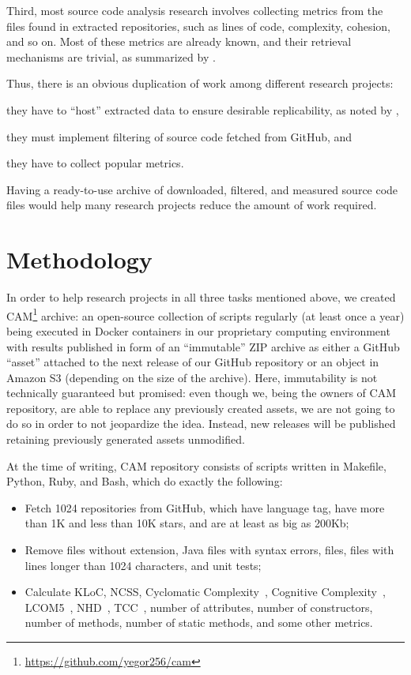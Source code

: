 \documentclass[11pt,sigplan,nonacm]{acmart}
\newcommand\cam{{\sffamily CAM}}
\begin{document}
Third, most source code analysis research involves collecting metrics from the files found in extracted repositories, such as lines of code, complexity, cohesion, and so on. Most of these metrics are already known, and their retrieval mechanisms are trivial, as summarized by \citet{nunez2017source}.

Thus, there is an obvious duplication of work among different research projects:
\begin{inparaenum}[(a)]
\item they have to ``host'' extracted data to ensure desirable replicability, as noted by \citet{7887704},
\item they must implement filtering of source code fetched from GitHub, and
\item they have to collect popular metrics.
\end{inparaenum}
Having a ready-to-use archive of downloaded, filtered, and measured source code files would help many research projects reduce the amount of work required.

\section{Methodology}

In order to help research projects in all three tasks mentioned above, we created \cam{}\footnote{\url{https://github.com/yegor256/cam}} archive: an open-source collection of scripts regularly (at least once a year) being executed in Docker containers in our proprietary computing environment with results published in form of an ``immutable'' ZIP archive as either a GitHub ``asset'' attached to the next release of our GitHub repository or an object in Amazon S3 (depending on the size of the archive). Here, immutability is not technically guaranteed but promised: even though we, being the owners of CAM repository, are able to replace any previously created assets, we are not going to do so in order to not jeopardize the idea. Instead, new releases will be published retaining previously generated assets unmodified.

At the time of writing, CAM repository consists of scripts written in Makefile, Python, Ruby, and Bash, which do exactly the following:
\begin{itemize}
    \item Fetch 1024 repositories from GitHub, which have  language tag, have more than 1K and less than 10K stars, and are at least as big as 200Kb;
    \item Remove files without  extension, Java files with syntax errors,  files, files with lines longer than 1024 characters, and unit tests;
    \item Calculate KLoC, NCSS, Cyclomatic Complexity~\citep{mccabe1976complexity}, Cognitive Complexity~\citep{campbell2018cognitive}, LCOM5~\citep{henderson1996coupling}, NHD~\citep{counsell2006interpretation}, TCC~\citep{bieman1995cohesion}, number of attributes, number of constructors, number of methods, number of static methods, and some other metrics.
\end{itemize}
\end{document}
